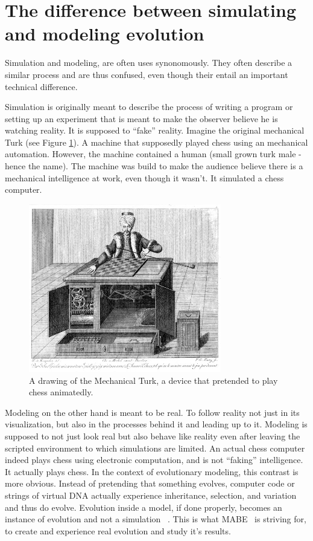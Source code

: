 \documentclass[12pt,oneside,listof=totoc,paper=a4,headings=small]{scrbook}
\begin{document}
\newpage
\section{The difference between simulating and modeling evolution}

Simulation and modeling, are often uses synonomously. They often describe a similar process and are thus confused, even though their entail an important technical difference.

Simulation is originally meant to describe the process of writing a program or setting up an experiment that is meant to make the observer believe he is watching reality. It is supposed to ``fake'' reality. Imagine the original mechanical Turk (see Figure \ref{fig:mechanica_turk}). A machine that supposedly played chess using an mechanical automation. However, the machine contained a human (small grown turk male - hence the name). The machine was build to make the audience believe there is a mechanical intelligence at work, even though it wasn't. It simulated a chess computer. 

\begin{figure}[h!]
\centering
\includegraphics[width=0.75\textwidth,height=0.75\textheight,keepaspectratio]{images/Tuerkischer_schachspieler_windisch4.jpg}
\caption{A drawing of the Mechanical Turk, a device that pretended to play chess animatedly.~\cite{mechTurk}}
\label{fig:mechanica_turk}
\end{figure}


Modeling on the other hand is meant to be real. To follow reality not just in its visualization, but also in the processes behind it and leading up to it. Modeling is supposed to not just look real but also behave like reality even after leaving the scripted environment to which simulations are limited. An actual chess computer indeed plays chess using electronic computation, and is not ``faking'' intelligence. It actually plays chess. In the context of evolutionary modeling, this contrast is more obvious. Instead of pretending that something evolves, computer code or strings of virtual DNA actually experience inheritance, selection, and variation and thus do evolve. Evolution inside a model, if done properly, becomes an instance of evolution and not a simulation ~\cite{Pennock:2007iy}. This is what MABE~\cite{bohm2017mabe,MABE2016} is striving for, to create and experience real evolution and study it's results.
\end{document}
